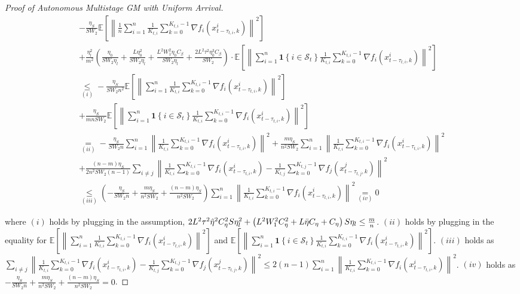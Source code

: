 \begin{proof}[Proof of Autonomous Multistage GM with Uniform Arrival]
\begin{equation}
\begin{gathered}
- \frac{\eta_S}{S W_2} \mathbb{E}\left[\left\| \frac{1}{n}\sum_{i=1}^n \frac{1}{K_{t,i}} \sum_{k=0}^{K_{t,i}-1} \nabla f_i(x_{t-\tau_{t,i},k}^i) \right\|^2\right]\\
+ \frac{\eta_l^2}{m^2}\left(\frac{\eta_0}{SW_2\eta_l}+\frac{L\eta_0^2}{SW_2\eta_l}+\frac{L^2W_1^2\eta_0C_\beta}{SW_2\eta_l}+\frac{2L^2\tau^2\eta_0^3C_\beta}{SW_2}\right) \cdot \mathbb{E}\left[\left\| \sum_{i=1}^n\mathbf{1}\left\{i\in\mathcal{S}_t\right\} \frac{1}{K_{t,i}} \sum_{k=0}^{K_{t,i}-1}  \nabla f_i(x_{t-\tau_{t,i},k}^i) \right\|^2\right] \\
\underset{(i)}{\leq} - \frac{\eta_S}{S W_2 n^2} \mathbb{E}\left[\left\| \sum_{i=1}^n \frac{1}{K_{t,i}} \sum_{k=0}^{K_{t,i}-1} \nabla f_i(x_{t-\tau_{t,i},k}^i) \right\|^2\right]\\
+ \frac{ \eta_S }{ mn SW_2}\mathbb{E}\left[\left\| \sum_{i=1}^n\mathbf{1}\left\{i\in\mathcal{S}_t\right\} \frac{1}{K_{t,i}} \sum_{k=0}^{K_{t,i}-1}  \nabla f_i(x_{t-\tau_{t,i},k}^i) \right\|^2\right] \\
\underset{(ii)}{=}  -\frac{\eta_S}{S W_2 n}\sum_{i=1}^n  \left\| \frac{1}{K_{t,i}} \sum_{k=0}^{K_{t,i}-1} \nabla f_i(x_{t-\tau_{t,i},k}^i)\right\|^2 + \frac{m  \eta_S}{ n^2 S W_2}   \sum_{i=1}^n  \left\| \frac{1}{K_{t,i}} \sum_{k=0}^{K_{t,i}-1} \nabla f_i(x_{t-\tau_{t,i},k}^i)\right\|^2 \\
+ \frac{(n-m)\eta_S}{2n^2SW_2(n-1)} \sum_{i\neq j} \left\| \frac{1}{K_{t,i}} \sum_{k=0}^{K_{t,i}-1} \nabla f_i(x_{t-\tau_{t,i},k}^i) - \frac{1}{K_{t,j}} \sum_{k=0}^{K_{t,j}-1} \nabla f_j(x_{t-\tau_{t,j},k}^j) \right\|^2 \\
\underset{(iii)}{\leq} \left(-\frac{\eta_S}{S W_2 n}+\frac{m  \eta_S}{ n^2 S W_2}+ \frac{(n-m)\eta_S}{n^2SW_2 } \right) \sum_{i=1}^n \left\| \frac{1}{K_{t,i}} \sum_{k=0}^{K_{t,i}-1} \nabla f_i(x_{t-\tau_{t,i},k}^i)\right\|^2 \underset{(iv)}{=} 0
\end{gathered}\nonumber
\end{equation}

where $(i)$ holds by plugging in the assumption, $2L^2\tau^2\hat{\eta}^2C_\eta^2 S \eta_l^2 + \left( L^2 W_1^2 C_\eta^2 + L \Bar{\eta} C_\eta + C_\eta \right) S \eta_l \leq \frac{m}{n}$. $(ii)$ holds by plugging in the equality for $\mathbb{E}\left[\left\| \sum_{i=1}^n \frac{1}{K_{t,i}} \sum_{k=0}^{K_{t,i}-1} \nabla f_i(x_{t-\tau_{t,i},k}^i) \right\|^2\right]$ and $\mathbb{E}\left[\left\| \sum_{i=1}^n\mathbf{1}\left\{i\in\mathcal{S}_t\right\} \frac{1}{K_{t,i}} \sum_{k=0}^{K_{t,i}-1}  \nabla f_i(x_{t-\tau_{t,i},k}^i) \right\|^2\right]$. $(iii)$ holds as $\sum_{i\neq j} \left\| \frac{1}{K_{t,i}} \sum_{k=0}^{K_{t,i}-1} \nabla f_i(x_{t-\tau_{t,i},k}^i) - \frac{1}{K_{t,j}} \sum_{k=0}^{K_{t,j}-1} \nabla f_j(x_{t-\tau_{t,j},k}^j) \right\|^2 \leq 2 (n-1) \sum_{i=1}^n \left\| \frac{1}{K_{t,i}} \sum_{k=0}^{K_{t,i}-1} \nabla f_i(x_{t-\tau_{t,i},k}^i)\right\|^2$. $(iv)$ holds as $-\frac{\eta_S}{S W_2 n}+\frac{m  \eta_S}{ n^2 S W_2}+ \frac{(n-m)\eta_S}{n^2SW_2 } = 0$.



\end{proof}

